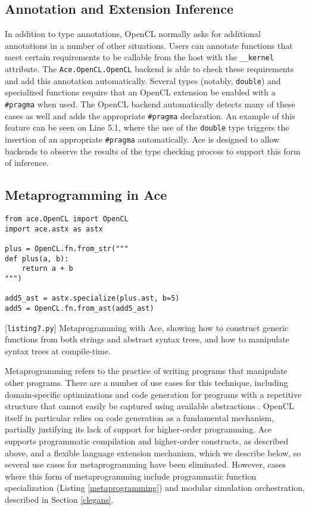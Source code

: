\documentclass[10pt, conference, compsocconf]{IEEEtran}
\begin{document}
\subsection{Annotation and Extension Inference}
In addition to type annotations, OpenCL normally asks for additional annotations in a number of other situations.  Users can annotate functions that meet certain requirements to be callable from the host with the \verb|__kernel| attribute. The \verb|Ace.OpenCL.OpenCL| backend is able to check these requirements and add this annotation automatically. Several types (notably, \verb|double|) and specialized functions require that an OpenCL extension be enabled with a \verb|#pragma| when used. The OpenCL backend automatically detects many of these cases as well and adds the appropriate \verb|#pragma| declaration. An example of this feature can be seen on Line 5.1, where the use of the \verb|double| type triggers the insertion of an appropriate \verb|#pragma| automatically. Ace is designed to allow backends to observe the results of the type checking process to support this form of inference.

\subsection{Metaprogramming in Ace}
\begin{codelisting}
\begin{lstlisting}[commentstyle=\color{mauve}]
from ace.OpenCL import OpenCL
import ace.astx as astx

plus = OpenCL.fn.from_str("""
def plus(a, b):
    return a + b
""")

add5_ast = astx.specialize(plus.ast, b=5)
add5 = OpenCL.fn.from_ast(add5_ast)
\end{lstlisting}
\caption{[\texttt{listing7.py}] Metaprogramming with Ace, showing how to construct generic functions from both strings and abstract syntax trees, and how to manipulate syntax trees at compile-time.}
\label{metaprogramming}
\end{codelisting}
Metaprogramming refers to the practice of writing programs that manipulate other programs. There are a number of use cases for this technique, including domain-specific optimizations and code generation for programs with a repetitive structure that cannot easily be captured using available abstractions \cite{pyopencl}. OpenCL itself in particular relies on code generation as a fundamental mechanism, partially justifying its lack of support for higher-order programming. Ace supports programmatic compilation and higher-order constructs, as described above, and a flexible language extension mechanism, which we describe below, so several use cases for metaprogramming have been eliminated. However, cases where this form of metaprogramming include programmatic function specialization (Listing \ref{metaprogramming}) and modular simulation orchestration, described in Section \ref{clegans}.
\end{document}
